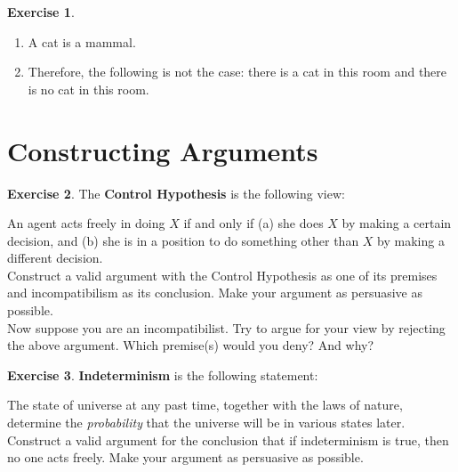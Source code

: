 \documentclass[11pt]{article}
\theoremstyle{definition}
\newtheorem{exer}{Exercise}
\begin{document}
\begin{exer}
\hfill
\begin{enumerate}
\item A cat is a mammal.
\item Therefore, the following is not the case: there is a cat in this room and there is no cat in this room. 
\end{enumerate}
\end{exer}

\section{Constructing Arguments}

\begin{exer}
\hfill

\noindent
The \textbf{Control Hypothesis} is the following view:

An agent acts freely in doing $X$ if and only if (a) she does $X$ by making a certain decision, and (b) she is in a position to do something other than $X$ by making a different decision.  \\

\noindent
Construct a valid argument with the Control Hypothesis as one of its premises and incompatibilism as its conclusion. Make your argument as persuasive as possible. \\

\noindent
Now suppose you are an incompatibilist. Try to argue for your view by rejecting the above argument. Which premise(s) would you deny? And why?

\end{exer}

\hfill

\begin{exer}
\hfill

\noindent
\textbf{Indeterminism} is the following statement: 

The state of universe at any past time, together with the laws of nature, determine the \textit{probability} that the universe will be in various states later. \\

\noindent
Construct a valid argument for the conclusion that if indeterminism is true, then no one acts freely. Make your argument as persuasive as possible.

\end{exer}

\hfill
\end{document}
